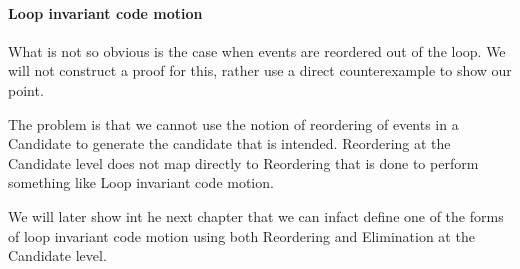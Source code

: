         \paragraph{Loop invariant code motion}
            What is not so obvious is the case when events are reordered out of the loop. We will not construct a proof for this, rather use a direct counterexample to show our point. 



            The problem is that we cannot use the notion of reordering of events in a Candidate to generate the candidate that is intended. Reordering at the Candidate level does not map directly to Reordering that is done to perform something like Loop invariant code motion. 

            We will later show int he next chapter that we can infact define one of the forms of loop invariant code motion using both Reordering and Elimination at the Candidate level.
             
    